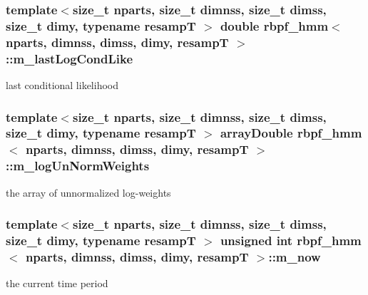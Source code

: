 \subsubsection[{\texorpdfstring{m\+\_\+last\+Log\+Cond\+Like}{m_lastLogCondLike}}]{\setlength{\rightskip}{0pt plus 5cm}template$<$size\+\_\+t nparts, size\+\_\+t dimnss, size\+\_\+t dimss, size\+\_\+t dimy, typename resampT $>$ double {\bf rbpf\+\_\+hmm}$<$ nparts, dimnss, dimss, dimy, resampT $>$\+::m\+\_\+last\+Log\+Cond\+Like\hspace{0.3cm}{\ttfamily [private]}}\hypertarget{classrbpf__hmm_aa0356c668abebeb05517aa15b641bd3c}{}\label{classrbpf__hmm_aa0356c668abebeb05517aa15b641bd3c}
last conditional likelihood 
\subsubsection[{\texorpdfstring{m\+\_\+log\+Un\+Norm\+Weights}{m_logUnNormWeights}}]{\setlength{\rightskip}{0pt plus 5cm}template$<$size\+\_\+t nparts, size\+\_\+t dimnss, size\+\_\+t dimss, size\+\_\+t dimy, typename resampT $>$ {\bf array\+Double} {\bf rbpf\+\_\+hmm}$<$ nparts, dimnss, dimss, dimy, resampT $>$\+::m\+\_\+log\+Un\+Norm\+Weights\hspace{0.3cm}{\ttfamily [private]}}\hypertarget{classrbpf__hmm_ad39632bbb88e1a1e8bb213343603fe6d}{}\label{classrbpf__hmm_ad39632bbb88e1a1e8bb213343603fe6d}
the array of unnormalized log-\/weights 
\subsubsection[{\texorpdfstring{m\+\_\+now}{m_now}}]{\setlength{\rightskip}{0pt plus 5cm}template$<$size\+\_\+t nparts, size\+\_\+t dimnss, size\+\_\+t dimss, size\+\_\+t dimy, typename resampT $>$ unsigned int {\bf rbpf\+\_\+hmm}$<$ nparts, dimnss, dimss, dimy, resampT $>$\+::m\+\_\+now\hspace{0.3cm}{\ttfamily [private]}}\hypertarget{classrbpf__hmm_a4efe6f063d6b2771c37ccb9a15ffa2c1}{}\label{classrbpf__hmm_a4efe6f063d6b2771c37ccb9a15ffa2c1}
the current time period 
